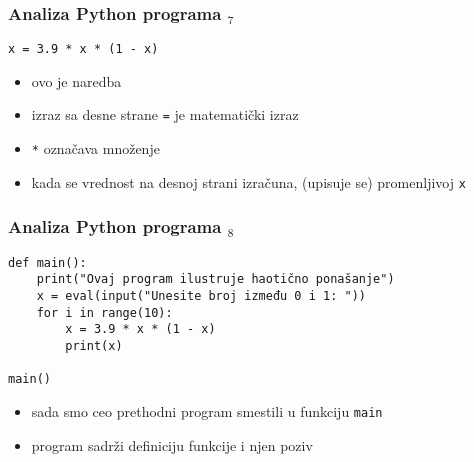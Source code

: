 \documentclass[utf8,compress,aspectratio=169]{beamer}
\begin{document}
\begin{frame}[fragile]
\frametitle{Analiza Python programa $_7$}
\begin{verbatim}
x = 3.9 * x * (1 - x)
\end{verbatim}
\begin{itemize}
  \item ovo je naredba 
  \item izraz sa desne strane \texttt{=} je matematički izraz
  \item \texttt{*} označava množenje
  \item kada se vrednost na desnoj strani izračuna,  (upisuje se) promenljivoj \texttt{x}
\end{itemize}
\end{frame}

\begin{frame}[fragile]
\frametitle{Analiza Python programa $_8$}
\begin{verbatim}
def main():
    print("Ovaj program ilustruje haotično ponašanje")
    x = eval(input("Unesite broj između 0 i 1: "))
    for i in range(10):
        x = 3.9 * x * (1 - x)
        print(x)

main()
\end{verbatim}
\begin{itemize}
  \item sada smo ceo prethodni program smestili u funkciju \texttt{main}
  \item program sadrži definiciju funkcije i njen poziv
\end{itemize}
\end{frame}
\end{document}
